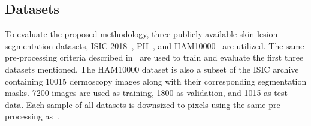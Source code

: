 \documentclass[runningheads]{llncs}
\begin{document}
\subsection{Datasets}
To evaluate the proposed methodology, three publicly available skin lesion segmentation datasets, ISIC 2018~\cite{codella2019skin}, PH~\cite{mendoncca2013ph}, and HAM10000~\cite{tschandl2018ham10000} are utilized. The same pre-processing criteria described in~\cite{azad2022transnorm} are used to train and evaluate the first three datasets mentioned. The HAM10000 dataset is also a subset of the ISIC archive containing 10015 dermoscopy images along with their corresponding segmentation masks. 7200 images are used as training, 1800 as validation, and 1015 as test data. Each sample of all datasets is downsized to  pixels using the same pre-processing as~\cite{alom2018recurrent}.
\end{document}
